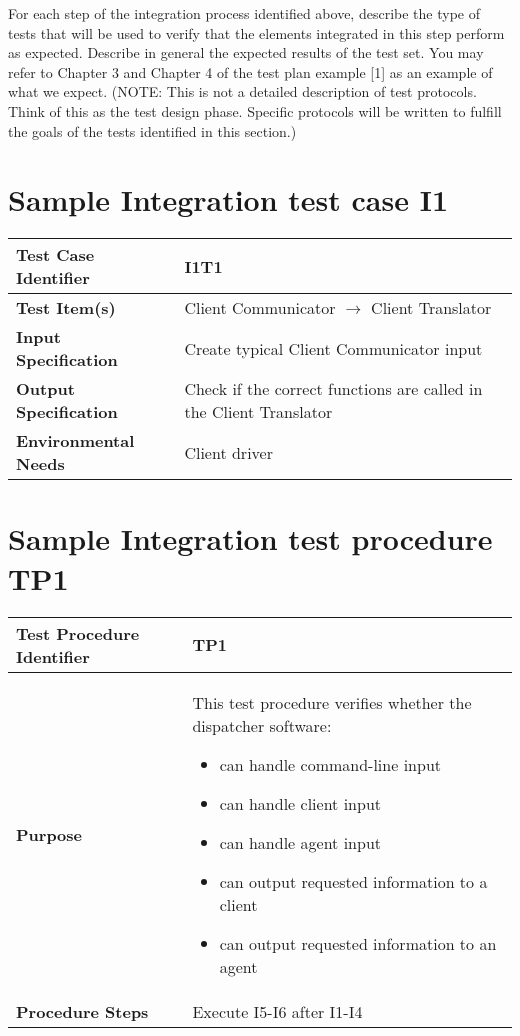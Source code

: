 For each step of the integration process identified above, describe the type of tests that will be used to verify that the elements integrated in this step perform as expected. Describe in general the expected results of the test set. You may refer to Chapter 3 and Chapter 4 of the test plan example [1] as an example of what we expect.
(NOTE: This is not a detailed description of test protocols. Think of this as the test design phase. Specific protocols will be written to fulfill the goals of the tests identified in this section.)

\section{Sample Integration test case I1}
\begin{center}
	\vspace{0.6cm}
	\begin{tabular}{|l|l|}
		\hline
		\textbf{Test Case Identifier} & I1T1 \bigstrut \\\hline
		\textbf{Test Item(s)} & Client Communicator \ensuremath{\rightarrow} Client Translator \bigstrut \\\hline
		\textbf{Input Specification} & Create typical Client Communicator input \bigstrut \\\hline
		\textbf{Output Specification} & Check if the correct functions are called in the Client Translator \bigstrut \\\hline
		\textbf{Environmental Needs} & Client driver \bigstrut \\\hline
	\end{tabular}
\end{center}

\newpage
\section{Sample Integration test procedure TP1}
\begin{center}
	\vspace{0.6cm}
	\begin{tabular}{|l|p{9cm}|}
		\hline
		\textbf{Test Procedure Identifier} & TP1 \bigstrut \\\hline
		\textbf{Purpose} 
		& This test procedure verifies whether the dispatcher software: 
		\begin{itemize} 
			\item can handle command-line input
			\item can handle client input
			\item can handle agent input
			\item can output requested information to a client
			\item can output requested information to an agent
		\end{itemize} \bigstrut \\\hline
		\textbf{Procedure Steps} & Execute I5-I6 after I1-I4 \bigstrut \\\hline
	\end{tabular}
\end{center}